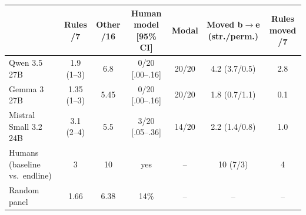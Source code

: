 \begin{tabular}{@{}lcccccc@{}}
\toprule
 & Rules /7 & Other /16 & Human model [95\% CI] & Modal & Moved b$\to$e (str./perm.) & Rules moved /7 \\
\midrule
Qwen 3.5 27B & 1.9 (1--3) & 6.8 & 0/20 [.00--.16] & 20/20 & 4.2 (3.7/0.5) & 2.8 \\
Gemma 3 27B & 1.35 (1--3) & 5.45 & 0/20 [.00--.16] & 20/20 & 1.8 (0.7/1.1) & 0.1 \\
Mistral Small 3.2 24B & 3.1 (2--4) & 5.5 & 3/20 [.05--.36] & 14/20 & 2.2 (1.4/0.8) & 1.0 \\
\midrule
Humans (baseline vs.\ endline) & 3 & 10 & yes & -- & 10 (7/3) & 4 \\
Random panel & 1.66 & 6.38 & 14\% & -- & -- & -- \\
\bottomrule
\end{tabular}
